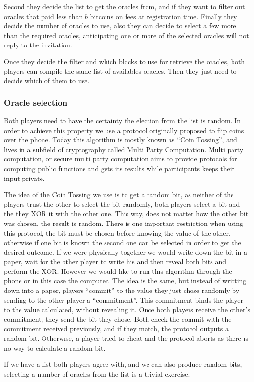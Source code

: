 Second they decide the list to get the oracles from, and if they want to filter
  out oracles that paid less than $b$ bitcoins on fees at registration time.
Finally they decide the number of oracles to use, also they can decide to
  select a few more than the required oracles, anticipating one or more of
  the selected oracles will not reply to the invitation.

Once they decide the filter and which blocks to use for retrieve the oracles,
  both players can compile the same list of availables oracles. Then they just
  need to decide which of them to use.

\subsubsection{Oracle selection}

Both players need to have the certainty the election from the list is random.
In order to achieve this property we use a protocol originally proposed to flip
  coins over the phone\cite{blum1983coin}.
Today this algorithm is mostly known as ``Coin Tossing'', and lives in a
  subfield of cryptography called Multi Party Computation.
Multi party computation, or secure multi party computation aims to provide
  protocols for computing public functions and gets its results while
  participants keeps their input private.

The idea of the Coin Tossing we use is to get a random bit, as neither of the
  players trust the other to select the bit randomly, both players select a bit
  and the they XOR it with the other one.
This way, does not matter how the other bit was chosen, the result is random.
There is one important restriction when using this protocol, the bit must be
  chosen before knowing the value of  the other, otherwise if one bit is known
  the second one can be selected in order to get the desired outcome.
If we were physically together we would write down the bit in a paper, wait for
  the other player to write his and then reveal both bits and perform the XOR.
However we would like to run this algorithm through the phone or in this case
  the computer.
The idea is the same, but instead of writting down into a paper, players
  ``commit'' to the value they just chose randomly by sending to the other
  player a ``commitment''.
This commitment binds the player to the value calculated, without revealing it.
Once both players receive the other's commitment, they send the bit they chose.
Both check the commit with the commitment received previously, and if they
  match, the protocol outputs a random bit.
Otherwise, a player tried to cheat and the protocol aborts as there is no way to
  calculate a random bit.

If we have a list both players agree with, and we can also produce random bits,
  selecting a number of oracles from the list is a trivial exercise.

